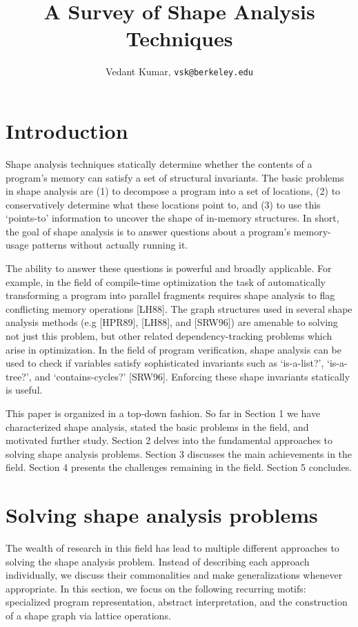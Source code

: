\documentclass{article}
\title{A Survey of Shape Analysis Techniques}
\author{Vedant Kumar, \texttt{vsk@berkeley.edu}}
\begin{document}
\maketitle

\section{Introduction}

Shape analysis techniques statically determine whether the contents of a
program's memory can satisfy a set of structural invariants. The basic
problems in shape analysis are (1) to decompose a program into a set of
locations, (2) to conservatively determine what these locations point to,
and (3) to use this `points-to' information to uncover the shape of
in-memory structures. In short, the goal of shape analysis is to answer
questions about a program's memory-usage patterns without actually running
it.

The ability to answer these questions is powerful and broadly applicable.
For example, in the field of compile-time optimization the task of
automatically transforming a program into parallel fragments requires shape
analysis to flag conflicting memory operations [LH88]. The graph structures
used in several shape analysis methods (e.g [HPR89], [LH88], and [SRW96])
are amenable to solving not just this problem, but other related
dependency-tracking problems which arise in optimization. In the field of
program verification, shape analysis can be used to check if variables
satisfy sophisticated invariants such as `is-a-list?', `is-a-tree?', and
`contains-cycles?' [SRW96]. Enforcing these shape invariants statically is
useful. 

This paper is organized in a top-down fashion. So far in Section 1 we have
characterized shape analysis, stated the basic problems in the field, and
motivated further study. Section 2 delves into the fundamental approaches to
solving shape analysis problems. Section 3 discusses the main achievements
in the field. Section 4 presents the challenges remaining in the field.
Section 5 concludes.

\section{Solving shape analysis problems}

The wealth of research in this field has lead to multiple different
approaches to solving the shape analysis problem. Instead of describing each
approach individually, we discuss their commonalities and make
generalizations whenever appropriate. In this section, we focus on the
following recurring motifs: specialized program representation, abstract
interpretation, and the construction of a shape graph via lattice
operations.
\end{document}
